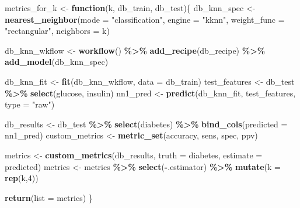 \documentclass[
]{book}
\newenvironment{Shaded}{\begin{snugshade}}{\end{snugshade}}
\newcommand{\AttributeTok}[1]{\textcolor[rgb]{0.13,0.29,0.53}{#1}}
\newcommand{\ControlFlowTok}[1]{\textcolor[rgb]{0.13,0.29,0.53}{\textbf{#1}}}
\newcommand{\DecValTok}[1]{\textcolor[rgb]{0.00,0.00,0.81}{#1}}
\newcommand{\FunctionTok}[1]{\textcolor[rgb]{0.13,0.29,0.53}{\textbf{#1}}}
\newcommand{\NormalTok}[1]{#1}
\newcommand{\OtherTok}[1]{\textcolor[rgb]{0.56,0.35,0.01}{#1}}
\newcommand{\SpecialCharTok}[1]{\textcolor[rgb]{0.81,0.36,0.00}{\textbf{#1}}}
\newcommand{\StringTok}[1]{\textcolor[rgb]{0.31,0.60,0.02}{#1}}
\begin{document}
\begin{Shaded}
\begin{Highlighting}[]
\NormalTok{metrics\_for\_k }\OtherTok{\textless{}{-}} \ControlFlowTok{function}\NormalTok{(k, db\_train, db\_test)\{}
\NormalTok{db\_knn\_spec }\OtherTok{\textless{}{-}} \FunctionTok{nearest\_neighbor}\NormalTok{(}\AttributeTok{mode =} \StringTok{"classification"}\NormalTok{,}
                             \AttributeTok{engine =} \StringTok{"kknn"}\NormalTok{,}
                             \AttributeTok{weight\_func =} \StringTok{"rectangular"}\NormalTok{,}
                             \AttributeTok{neighbors =}\NormalTok{ k)}

\NormalTok{db\_knn\_wkflow }\OtherTok{\textless{}{-}} \FunctionTok{workflow}\NormalTok{() }\SpecialCharTok{\%\textgreater{}\%}
  \FunctionTok{add\_recipe}\NormalTok{(db\_recipe) }\SpecialCharTok{\%\textgreater{}\%}
  \FunctionTok{add\_model}\NormalTok{(db\_knn\_spec)}

\NormalTok{db\_knn\_fit }\OtherTok{\textless{}{-}} \FunctionTok{fit}\NormalTok{(db\_knn\_wkflow, }\AttributeTok{data =}\NormalTok{ db\_train)}
\NormalTok{test\_features }\OtherTok{\textless{}{-}}\NormalTok{ db\_test }\SpecialCharTok{\%\textgreater{}\%} \FunctionTok{select}\NormalTok{(glucose, insulin)}
\NormalTok{nn1\_pred }\OtherTok{\textless{}{-}} \FunctionTok{predict}\NormalTok{(db\_knn\_fit, test\_features, }\AttributeTok{type =} \StringTok{"raw"}\NormalTok{)}

\NormalTok{db\_results }\OtherTok{\textless{}{-}}\NormalTok{ db\_test }\SpecialCharTok{\%\textgreater{}\%} 
  \FunctionTok{select}\NormalTok{(diabetes) }\SpecialCharTok{\%\textgreater{}\%} 
  \FunctionTok{bind\_cols}\NormalTok{(}\AttributeTok{predicted =}\NormalTok{ nn1\_pred)}
\NormalTok{custom\_metrics }\OtherTok{\textless{}{-}} \FunctionTok{metric\_set}\NormalTok{(accuracy, sens, spec, ppv)}

\NormalTok{metrics }\OtherTok{\textless{}{-}} \FunctionTok{custom\_metrics}\NormalTok{(db\_results,}
               \AttributeTok{truth =}\NormalTok{ diabetes,}
               \AttributeTok{estimate =}\NormalTok{ predicted) }
\NormalTok{metrics }\OtherTok{\textless{}{-}}\NormalTok{ metrics }\SpecialCharTok{\%\textgreater{}\%} \FunctionTok{select}\NormalTok{(}\SpecialCharTok{{-}}\NormalTok{.estimator) }\SpecialCharTok{\%\textgreater{}\%} \FunctionTok{mutate}\NormalTok{(}\AttributeTok{k =} \FunctionTok{rep}\NormalTok{(k,}\DecValTok{4}\NormalTok{))}

\FunctionTok{return}\NormalTok{(}\AttributeTok{list =}\NormalTok{ metrics)}
\NormalTok{\}}
\end{Highlighting}
\end{Shaded}
\end{document}
